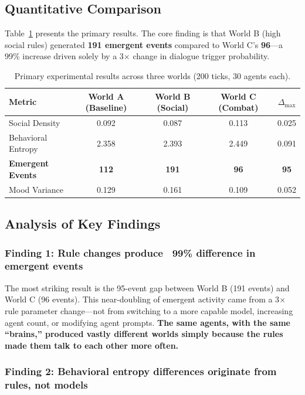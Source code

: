 \documentclass[11pt]{article}
\begin{document}
\subsection{Quantitative Comparison}

Table~\ref{tab:results} presents the primary results.
The core finding is that World B (high social rules) generated \textbf{191 emergent events} compared to World C's \textbf{96}---a 99\% increase driven solely by a 3$\times$ change in dialogue trigger probability.

\begin{table}[H]
\centering
\caption{Primary experimental results across three worlds (200 ticks, 30 agents each).}
\label{tab:results}
\begin{tabular}{l c c c c}
\toprule
\textbf{Metric} & \textbf{World A (Baseline)} & \textbf{World B (Social)} & \textbf{World C (Combat)} & \textbf{$\Delta_{\max}$} \\
\midrule
Social Density        & 0.092 & 0.087 & 0.113 & 0.025 \\
Behavioral Entropy    & 2.358 & 2.393 & 2.449 & 0.091 \\
\textbf{Emergent Events} & \textbf{112} & \textbf{191} & \textbf{96} & \textbf{95} \\
Mood Variance         & 0.129 & 0.161 & 0.109 & 0.052 \\
\bottomrule
\end{tabular}
\end{table}

\subsection{Analysis of Key Findings}

\subsubsection{Finding 1: Rule changes produce ~99\% difference in emergent events}

The most striking result is the 95-event gap between World B (191 events) and World C (96 events).
This near-doubling of emergent activity came from a 3$\times$ rule parameter change---not from switching to a more capable model, increasing agent count, or modifying agent prompts.
\textbf{The same agents, with the same ``brains,'' produced vastly different worlds simply because the rules made them talk to each other more often.}

\subsubsection{Finding 2: Behavioral entropy differences originate from rules, not models}
\end{document}
